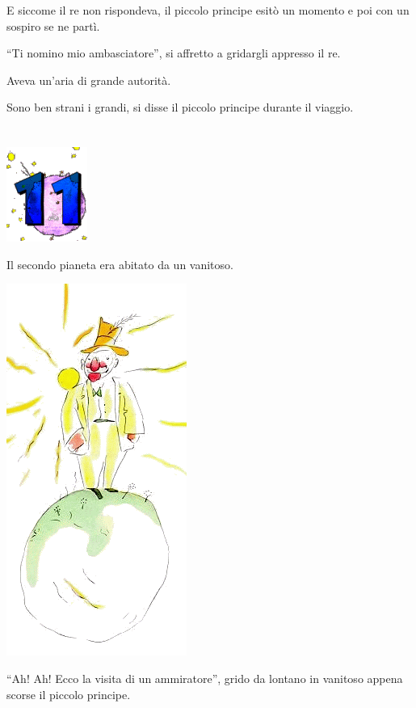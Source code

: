 \documentclass[11pt]{scrbook}
\begin{document}
E siccome il re non rispondeva, il piccolo principe esitò un momento e
poi con un sospiro se ne partì.

``Ti nomino mio ambasciatore'', si affretto a gridargli appresso il re.

Aveva un'aria di grande autorità.

Sono ben strani i grandi, si disse il piccolo principe durante il
viaggio.

\chapter{}
\begin{center}
\includegraphics{img/chapter11}
\end{center}

Il secondo pianeta era abitato da un vanitoso.

\begin{center}
\includegraphics{img/11a}
\end{center}

``Ah! Ah! Ecco la visita di un ammiratore'', grido da lontano in
vanitoso appena scorse il piccolo principe.
\end{document}
